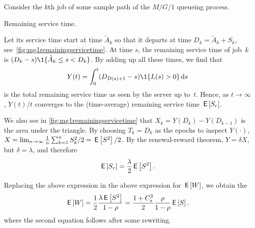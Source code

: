 Consider the $k$th job of some sample path of the $M/G/1$ queueing process.
\begin{marginfigure}

 \caption{Remaining service time.}
 \label{fig:mg1remainingservicetime}
\end{marginfigure}
Let its service time start at time $\tilde A_k$ so that it departs at time $D_k=\tilde A_k + S_k$, see~\cref{fig:mg1remainingservicetime}.
At time $s$,  the remaining service time of job~$k$ is 
$(D_k-s)\1{\tilde A_k \leq s < D_k}$. 
By adding up all these times,  we find that
 \begin{equation*}
 Y(t) = \int_0^t (D_{D(s)+1}-s)\1{\L(s) > 0} \d s
 \end{equation*}
 is the total remaining service time as seen by the server up to~$t$.
 Hence,   as $t \to \infty$, $Y(t)/t$ converges to the  (time-average) remaining service time $\,\mathsf{E}\left[S_r\right]$. 

 We also see in \cref{fig:mg1remainingservicetime} that $X_k = Y(D_k) - Y(D_{k-1})$ is the area under the triangle.
 By choosing $T_k=D_k$ as the epochs to inspect $Y(\cdot)$, $X=\lim_{n\to\infty} \frac{1}{n}\sum_{k=1}^n S_k^2/ 2 = \,\mathsf{E}\left[S^2\right]/2$.
 By the renewal-reward theorem, $Y=\delta X$, but $\delta = \lambda$, and therefore
\begin{equation*}
\,\mathsf{E}\left[S_r\right] = \frac{\lambda}2 \,\mathsf{E}\left[S^2\right]. 
\end{equation*}

Replacing the above expression in the above expression for $\,\mathsf{E}\left[W\right]$, we obtain the 
\begin{equation} \label{eq:710}
 \,\mathsf{E}\left[W\right] = \frac 1 2 \frac{\lambda \,\mathsf{E}\left[S^2\right]}{1-\rho} =\frac{1 + C_s^2}2 \frac{\rho}{1-\rho} \,\mathsf{E}\left[S\right],
\end{equation}
where the second equation follows after some rewriting. 

